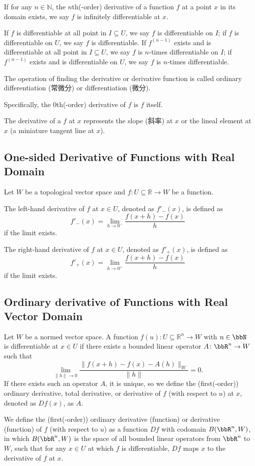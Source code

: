 If for any $n\in\mathbb{N}$, the $n$th(-order) derivative of a function $f$ at a point $x$ in its domain exists, we say $f$ is infinitely differentiable at $x$.

If $f$ is differentiable at all point in $I\subseteq U$, we say $f$ is differentiable on $I$; if $f$ is differentiable on $U$, we say $f$ is differentiable. If $f^{(n-1)}$ exists and is differentiable at all point in $I\subseteq U$, we say $f$ is $n$-times differentiable on $I$; if $f^{(n-1)}$ exists and is differentiable on $U$, we say $f$ is $n$-times differentiable.

The operation of finding the derivative or derivative function is called ordinary differentiation (常微分) or differentiation (微分).

Specifically, the $0$th(-order) derivative of $f$ is $f$ itself.

The derivative of a $f$ at $x$ represents the slope (斜率) at $x$ or the lineal element at $x$ (a miniature tangent line at $x$).
\subsection{One-sided Derivative of Functions with Real Domain}
Let $W$ be a topological vector space and $f\colon U\subseteq\mathbb{R}\to W$ be a function.

The left-hand derivative of $f$ at $x\in U$, denoted as $f'_-(x)$, is defined as
\[f'_-(x)=\lim_{h\to 0^-}\frac{f(x+h)-f(x)}{h}\]
if the limit exists.

The right-hand derivative of $f$ at $x\in U$, denoted as $f'_+(x)$, is defined as
\[f'_+(x)=\lim_{h\to 0^+}\frac{f(x+h)-f(x)}{h}\]
if the limit exists.
\subsection{Ordinary derivative of Functions with Real Vector Domain}
Let $W$ be a normed vector space. A function $f(u)\colon U\subseteq\mathbb{R}^n\to W$ with $n\in\bbN$ is differentiable at $x\in U$ if there exists a bounded linear operator $A\colon\bbR^n\to W$ such that
\[\lim_{\|h\|\to 0}\frac{\|f(x+h)-f(x)-A(h)\|_W}{\|h\|}=0.\]
If there exists such an operator $A$, it is unique, so we define the (first(-order)) ordinary derivative, total derivative, or derivative of $f$ (with respect to $u$) at $x$, denoted as $Df(x)$, as $A$.

We define the (first(-order)) ordinary derivative (function) or derivative (function) of $f$ (with respect to $u$) as a function $Df$ with codomain $B(\bbR^n,W)$, in which $B(\bbR^n,W)$ is the space of all bounded linear operators from $\bbR^n$ to $W$, such that for any $x\in U$ at which $f$ is differentiable, $Df$ maps $x$ to the derivative of $f$ at $x$.

